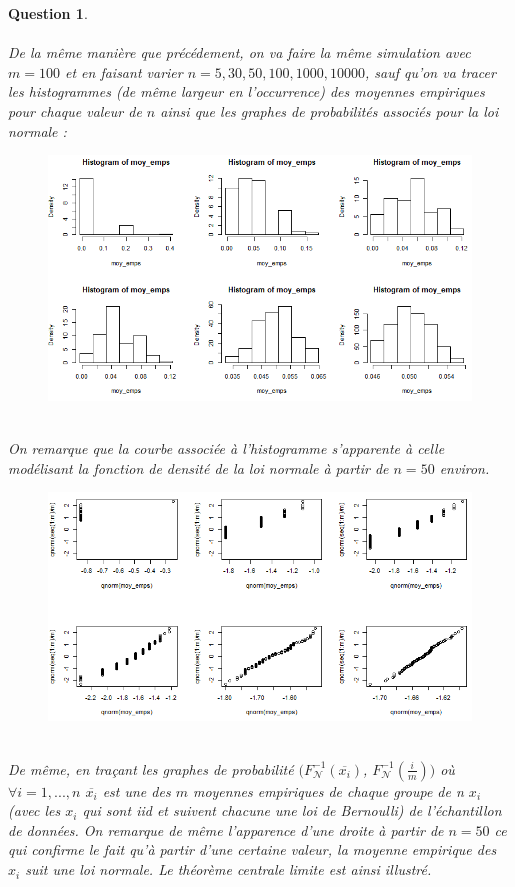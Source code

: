 \documentclass[a4paper,11pt]{article}
\newtheorem{exo4}{Question}
\begin{document}
\begin{exo4} \ \\ \\
De la même manière que précédement, on va faire la même simulation avec $m=100$ et en faisant varier $n=5,30,50,100,1000,10000$, sauf qu'on va tracer les histogrammes (de même largeur en l'occurrence) des moyennes empiriques pour chaque valeur de $n$ ainsi que les graphes de probabilités associés pour la loi normale :
\newpage
\begin{figure}[h]
\includegraphics[scale=1]{images/Q4_3_histo.PNG}
\end{figure} \ \\
On remarque que la courbe associée à l'histogramme s'apparente à celle modélisant la fonction de densité de la loi normale à partir de $n=50$ environ.
\begin{figure}[h]
\includegraphics[scale=1]{images/Q4_3_proba.PNG}
\end{figure} \ \\
De même, en traçant les graphes de probabilité $(F_{\mathscr{N}}^{-1}(\overline{x_{i}})$, $F_{\mathscr{N}}^{-1}(\frac{i}{m}))$ où  $\forall i=1,...,n$ $\overline{x_{i}}$ est une des $m$ moyennes empiriques de chaque groupe de n $x_{i}$ (avec les $x_{i}$ qui sont iid et suivent chacune une loi de Bernoulli) de l'échantillon de données. On remarque de même l'apparence d'une droite à partir de $n=50$ ce qui confirme le fait qu'à partir d'une certaine valeur, la moyenne empirique des $x_{i}$ suit une loi normale. Le théorème centrale limite est ainsi illustré.
\end{exo4}
\end{document}

